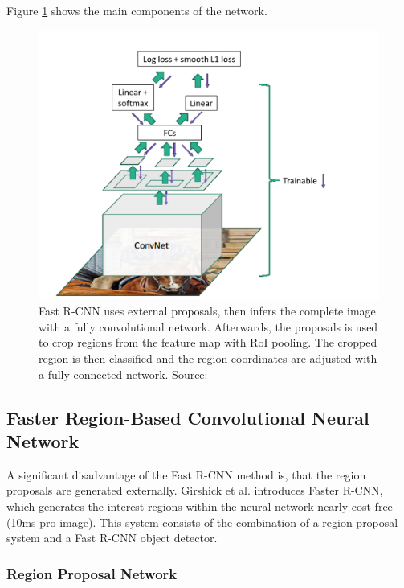 Figure \ref{fig:fastrcnn} shows the main components of the network.
\bigbreak
\begin{figure}[h!]
	\centering
	\includegraphics[width=12cm]{images/mt/fast-rcnn.pdf}
	\caption{Fast R-CNN uses external proposals, then infers the complete image with a fully convolutional network. Afterwards, the proposals is used to crop regions from the feature map with RoI pooling. The cropped region is then classified and the region coordinates are adjusted with a fully connected network. Source: \cite{Girshick16}}
	\label{fig:fastrcnn}
\end{figure}
\bigbreak
\subsection{Faster Region-Based Convolutional Neural Network}\label{s:fasterrcnn}

A significant disadvantage of the Fast R-CNN method is, that the region proposals are generated externally. Girshick et al. \cite{NIPS2015_5638} introduces Faster R-CNN, which generates the interest regions within the neural network nearly cost-free (10ms pro image). This system consists of the combination of a region proposal system and a Fast R-CNN object detector.
\bigbreak
\subsubsection{Region Proposal Network}


